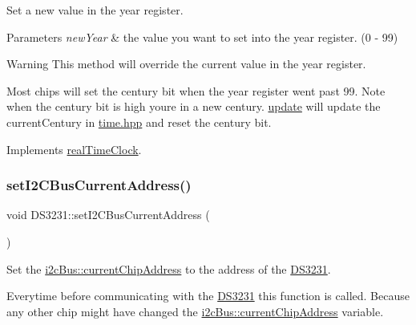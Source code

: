 Set a new value in the year register. 


\begin{DoxyParams}{Parameters}
{\em new\+Year} & the value you want to set into the year register. (0 -\/ 99) \\
\hline
\end{DoxyParams}
\begin{DoxyWarning}{Warning}
This method will override the current value in the year register. 

Most chips will set the century bit when the year register went past 99. Note when the century bit is high you\textquotesingle{}re in a new century. \mbox{\hyperlink{class_d_s3231_a143ec57122d892ea0ec671a153352f2c}{update}} will update the current\+Century in \mbox{\hyperlink{time_8hpp_source}{time.\+hpp}} and reset the century bit. 
\end{DoxyWarning}


Implements \mbox{\hyperlink{classreal_time_clock_a4d6e8056f52cea52bab5c635c0860c12}{real\+Time\+Clock}}.

\mbox{\label{class_d_s3231_ae6ef1547a0d2c2653ae3fe4c0f6a62ff}} 
\subsubsection{\texorpdfstring{set\+I2\+C\+Bus\+Current\+Address()}{setI2CBusCurrentAddress()}}
{\footnotesize\ttfamily void D\+S3231\+::set\+I2\+C\+Bus\+Current\+Address (\begin{DoxyParamCaption}{ }\end{DoxyParamCaption})\hspace{0.3cm}{\ttfamily [private]}}



Set the \mbox{\hyperlink{classi2c_bus_a64ff87527c88619d72ede947d73eac3a}{i2c\+Bus\+::current\+Chip\+Address}} to the address of the \mbox{\hyperlink{class_d_s3231}{D\+S3231}}. 

Everytime before communicating with the \mbox{\hyperlink{class_d_s3231}{D\+S3231}} this function is called. Because any other chip might have changed the \mbox{\hyperlink{classi2c_bus_a64ff87527c88619d72ede947d73eac3a}{i2c\+Bus\+::current\+Chip\+Address}} variable. \mbox{\label{class_d_s3231_a303a9a5123f66987e209396d60e329e8}} 
